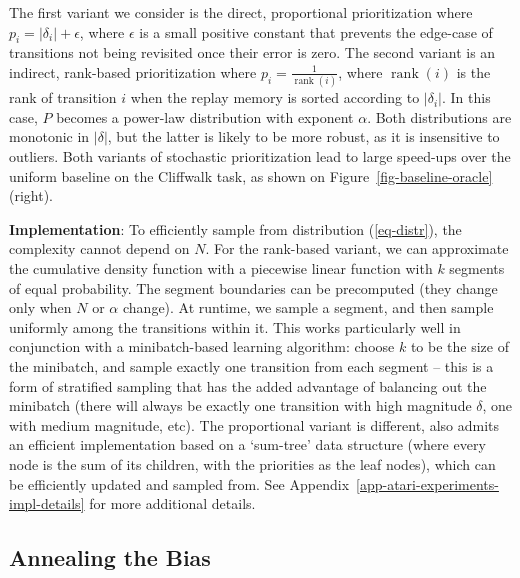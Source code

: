 \documentclass[a4paper]{article}
\begin{document}
The first variant we consider is the direct, proportional prioritization where $p_i = |\delta_i| + \epsilon$, 
where $\epsilon$ is a small positive constant that prevents the edge-case of transitions not being revisited once their 
error is zero.
The second variant is an indirect, rank-based prioritization where $p_i = \frac{1}{\operatorname{rank}(i)}$,
where $\operatorname{rank}(i)$ is the rank of transition $i$ when the replay memory is sorted according to $|\delta_i|$.
In this case, $P$ becomes a power-law distribution with exponent $\alpha$.
Both distributions are monotonic in $|\delta|$, but the latter is likely to be more robust, 
as it is insensitive to outliers. 
Both variants of stochastic prioritization lead to large 
speed-ups over the uniform baseline on the Cliffwalk task, as shown on Figure~\ref{fig-baseline-oracle} (right).

{\bf Implementation}: To efficiently sample from distribution (\ref{eq-distr}), the complexity cannot depend on $N$.
For the rank-based variant, we can approximate the cumulative density function with a piecewise linear function with $k$ segments of equal probability.
The segment boundaries can be precomputed (they change only when $N$ or $\alpha$ change).
At runtime, we sample a segment, and then sample uniformly among the transitions
within it. This works particularly well in conjunction with a minibatch-based learning algorithm: 
choose $k$ to be the size of the minibatch, and sample exactly one transition from each segment --
this is a form of stratified sampling that has the added advantage of balancing out the minibatch 
(there will always be exactly one transition with high magnitude $\delta$, one with medium magnitude, etc).
The proportional variant is different, also admits an efficient implementation based
on a `sum-tree' data structure (where every node is the sum of its children, with the priorities as the leaf nodes), which can be efficiently updated and sampled from.  
See Appendix~\ref{app-atari-experiments-impl-details} for more additional details.







\subsection{Annealing the Bias}
\label{sec-anneal}
\end{document}
